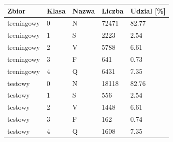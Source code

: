 \begin{tabular}{lllll}
\toprule
Zbior & Klasa & Nazwa & Liczba & Udzial [\%] \\
\midrule
treningowy & 0 & N & 72471 & 82.77 \\
treningowy & 1 & S & 2223 & 2.54 \\
treningowy & 2 & V & 5788 & 6.61 \\
treningowy & 3 & F & 641 & 0.73 \\
treningowy & 4 & Q & 6431 & 7.35 \\
testowy & 0 & N & 18118 & 82.76 \\
testowy & 1 & S & 556 & 2.54 \\
testowy & 2 & V & 1448 & 6.61 \\
testowy & 3 & F & 162 & 0.74 \\
testowy & 4 & Q & 1608 & 7.35 \\
\bottomrule
\end{tabular}
